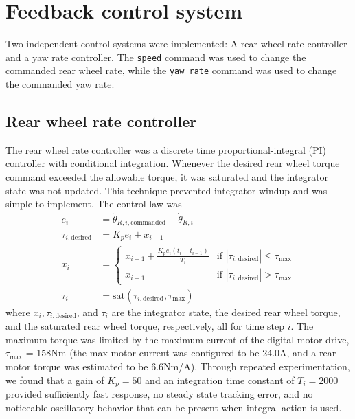 \section{Feedback control system}
Two independent control systems were implemented: A rear wheel rate controller
and a yaw rate controller. The \verb|speed| command was used to change the
commanded rear wheel rate, while the \verb|yaw_rate| command was used to change
the commanded yaw rate.

\subsection{Rear wheel rate controller} \label{rb:subsec:rw_control}
The rear wheel rate controller was a discrete time proportional-integral (PI)
controller with conditional integration. Whenever the desired rear
wheel torque command exceeded the allowable torque, it was saturated and the
integrator state was not updated. This technique prevented integrator windup
and was simple to implement. The control law was
\begin{align}
  e_i &= \dot{\theta}_{R,i,\text{commanded}} - \dot{\theta}_{R,i} \\
  \tau_{i,\text{desired}} &= K_p e_i + x_{i-1}\\
  x_{i} &= \left\{
      \begin{matrix}
        x_{i-1} + \frac{K_p e_i (t_i - t_{i-1})}{T_i} & \text{if } |\tau_{i,\text{desired}}| \leq \tau_{\text{max}} \\
        x_{i-1} & \text{if } |\tau_{i,\text{desired}}| > \tau_{\text{max}}
      \end{matrix}
    \right. \\
  \tau_{i} &= \text{sat}(\tau_{i, \text{desired}}, \tau_{\text{max}})
\end{align}
where $x_{i}, \tau_{i,\text{desired}}$, and  $\tau_{i}$ are the integrator
state, the desired rear wheel torque, and the saturated rear wheel torque,
respectively, all for time step $i$. The maximum torque was limited by the
maximum current of the digital motor drive, $\tau_{\text{max}}$ = 158Nm (the
max motor current was configured to be 24.0A, and a rear motor torque was
estimated to be 6.6Nm/A). Through repeated experimentation, we found that a
gain of $K_p =50$ and an integration time constant of $T_i = 2000$ provided
sufficiently fast response, no steady state tracking error, and no noticeable
oscillatory behavior that can be present when integral action is used.

